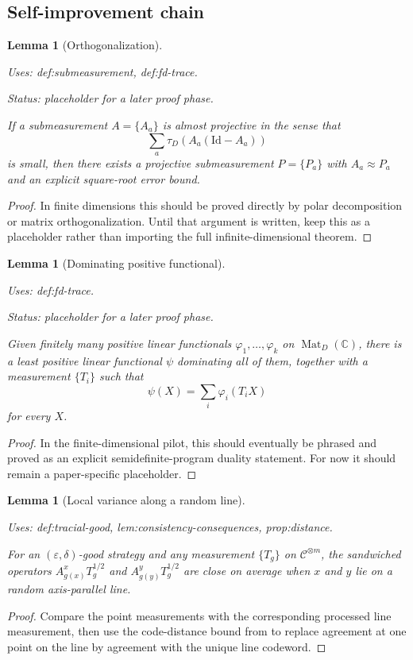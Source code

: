 \documentclass{article}
\providecommand{\uses}[1]{\par\smallskip\noindent\emph{Uses:} #1.\par\smallskip}
\providecommand{\notready}{\par\smallskip\noindent\emph{Status: placeholder for a later proof phase.}\par\smallskip}
\newtheorem{lemma}[definition]{Lemma}
\theoremstyle{remark}
\newcommand{\C}{\mathbb{C}}
\newcommand{\id}{\mathrm{Id}}
\newcommand{\Mat}{\operatorname{Mat}}
\newcommand{\code}{\mathcal{C}}
\newcommand{\eps}{\varepsilon}
\begin{document}
\subsection{Self-improvement chain}

\begin{lemma}[Orthogonalization]\label{lem:projectivization}
  \uses{def:submeasurement, def:fd-trace}
  \notready
  If a submeasurement $A=\{A_a\}$ is almost projective in the sense that
  \[
    \sum_a \tau_D(A_a(\id-A_a))
  \]
  is small, then there exists a projective submeasurement $P=\{P_a\}$ with $A_a\approx P_a$ and an explicit square-root error bound.
\end{lemma}
\begin{proof}
  In finite dimensions this should be proved directly by polar decomposition or matrix orthogonalization. Until that argument is written, keep this as a placeholder rather than importing the full infinite-dimensional theorem.
\end{proof}

\begin{lemma}[Dominating positive functional]\label{lem:duality}
  \uses{def:fd-trace}
  \notready
  Given finitely many positive linear functionals $\varphi_1,\dots,\varphi_k$ on $\Mat_D(\C)$, there is a least positive linear functional $\psi$ dominating all of them, together with a measurement $\{T_i\}$ such that
  \[
    \psi(X)=\sum_i \varphi_i(T_iX)
  \]
  for every $X$.
\end{lemma}
\begin{proof}
  In the finite-dimensional pilot, this should eventually be phrased and proved as an explicit semidefinite-program duality statement. For now it should remain a paper-specific placeholder.
\end{proof}

\begin{lemma}[Local variance along a random line]\label{lem:local-variance}
  \uses{def:tracial-good, lem:consistency-consequences, prop:distance}
  For an $(\eps,\delta)$-good strategy and any measurement $\{T_g\}$ on $\code^{\otimes m}$, the sandwiched operators $A^x_{g(x)}T_g^{1/2}$ and $A^y_{g(y)}T_g^{1/2}$ are close on average when $x$ and $y$ lie on a random axis-parallel line.
\end{lemma}
\begin{proof}
  Compare the point measurements with the corresponding processed line measurement, then use the code-distance bound from  to replace agreement at one point on the line by agreement with the unique line codeword.
\end{proof}
\end{document}
